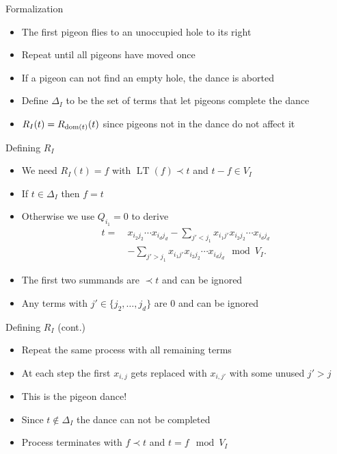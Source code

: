 \documentclass[xcolor={dvipsnames}, aspectratio=169, handout]{beamer}
\newcommand{\LT}{\operatorname{LT}}
\begin{document}
\begin{frame}{Formalization}
    \begin{itemize}[<+->]
        \item The first pigeon flies to an unoccupied hole to its right
        \item Repeat until all pigeons have moved once
        \item If a pigeon can not find an empty hole, the dance is aborted
        \item Define $\Delta_I$ to be the set of terms that let pigeons complete the dance
        \item $R_I(t) = R_{\operatorname{dom}(t)}(t)$ since pigeons not in the dance do not affect it
    \end{itemize}
\end{frame}

\begin{frame}{Defining $R_I$}
    \begin{itemize}[<+->]
        \item We need $R_I(t) = f$ with $\LT(f) \prec t$ and $t - f \in V_I$
        \item If $t \in \Delta_I$ then $f = t$
        \item Otherwise we use $Q_{i_1} = 0$ to derive
            \begin{align*}
                t = \ &x_{i_2 j_2} \cdots x_{i_d j_d} - \sum_{j' < j_1} x_{i_1 j'} x_{i_2 j_2} \cdots x_{i_d j_d}\\
                &- \sum_{j' > j_1} x_{i_1 j'} x_{i_2 j_2} \cdots x_{i_d j_d} \mod V_I.
            \end{align*}
        \item The first two summands are $\prec t$ and can be ignored
        \item Any terms with $j' \in \{j_2, \ldots, j_d\}$ are $0$ and can be ignored
    \end{itemize}
\end{frame}

\begin{frame}{Defining $R_I$ (cont.)}
    \begin{itemize}[<+->]
        \item Repeat the same process with all remaining terms
        \item At each step the first $x_{i, j}$ gets replaced with $x_{i, j'}$ with some unused $j' > j$
        \item This is the pigeon dance!
        \item Since $t \not\in \Delta_I$ the dance can not be completed
        \item Process terminates with $f \prec t$ and $t = f \mod V_I$
    \end{itemize}
\end{frame}
\end{document}
